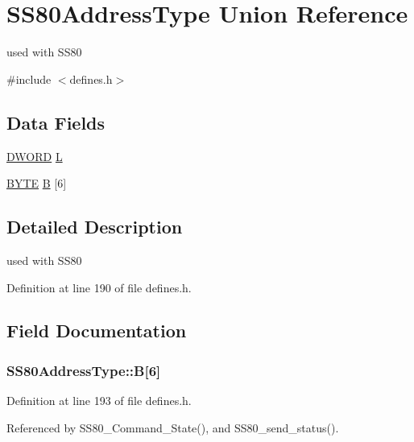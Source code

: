 \hypertarget{unionSS80AddressType}{}\section{S\+S80\+Address\+Type Union Reference}
\label{unionSS80AddressType}


used with S\+S80  




{\ttfamily \#include $<$defines.\+h$>$}

\subsection*{Data Fields}
\begin{DoxyCompactItemize}
\item 
\hyperlink{integer_8h_ad342ac907eb044443153a22f964bf0af}{D\+W\+O\+RD} \hyperlink{unionSS80AddressType_a4949ed9f8da550f9e09937db92750586}{L}
\item 
\hyperlink{integer_8h_a4ae1dab0fb4b072a66584546209e7d58}{B\+Y\+TE} \hyperlink{unionSS80AddressType_a0f11f4f6624071d1844f92934f05a8f9}{B} \mbox{[}6\mbox{]}
\end{DoxyCompactItemize}


\subsection{Detailed Description}
used with S\+S80 

Definition at line 190 of file defines.\+h.



\subsection{Field Documentation}
\subsubsection[{\texorpdfstring{B}{B}}]{ S\+S80\+Address\+Type\+::B\mbox{[}6\mbox{]}}\hypertarget{unionSS80AddressType_a0f11f4f6624071d1844f92934f05a8f9}{}\label{unionSS80AddressType_a0f11f4f6624071d1844f92934f05a8f9}


Definition at line 193 of file defines.\+h.



Referenced by S\+S80\+\_\+\+Command\+\_\+\+State(), and S\+S80\+\_\+send\+\_\+status().

